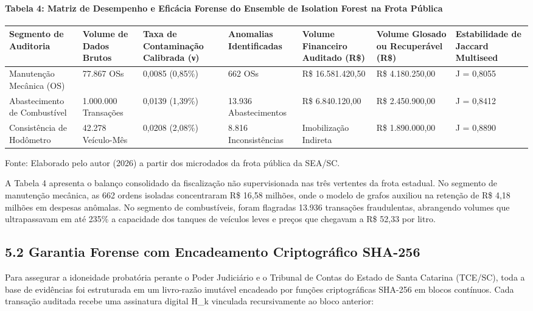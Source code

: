 \documentclass[10pt,a4paper,journal]{article}
\begin{document}
\paragraph{Tabela 4: Matriz de Desempenho e Eficácia Forense do Ensemble de Isolation Forest na Frota Pública}
\begin{table}[htbp]
\centering
\small
\begin{tabular}{lllllll}
\toprule
Segmento de Auditoria & Volume de Dados Brutos & Taxa de Contaminação Calibrada (ν) & Anomalias Identificadas & Volume Financeiro Auditado (R\$) & Volume Glosado ou Recuperável (R\$) & Estabilidade de Jaccard Multiseed \\
\midrule
Manutenção Mecânica (OS) & 77.867 OSs & 0,0085 (0,85\%) & 662 OSs & R\$ 16.581.420,50 & R\$ 4.180.250,00 & J = 0,8055 \\
Abastecimento de Combustível & 1.000.000 Transações & 0,0139 (1,39\%) & 13.936 Abastecimentos & R\$ 6.840.120,00 & R\$ 2.450.900,00 & J = 0,8412 \\
Consistência de Hodômetro & 42.278 Veículo-Mês & 0,0208 (2,08\%) & 8.816 Inconsistências & Imobilização Indireta & R\$ 1.890.000,00 & J = 0,8890 \\
\bottomrule
\end{tabular}
\end{table}
Fonte: Elaborado pelo autor (2026) a partir dos microdados da frota pública da SEA/SC.

A Tabela 4 apresenta o balanço consolidado da fiscalização não supervisionada nas três vertentes da frota estadual. No segmento de manutenção mecânica, as 662 ordens isoladas concentraram R\$ 16,58 milhões, onde o modelo de grafos auxiliou na retenção de R\$ 4,18 milhões em despesas anômalas. No segmento de combustíveis, foram flagradas 13.936 transações fraudulentas, abrangendo volumes que ultrapassavam em até 235\% a capacidade dos tanques de veículos leves e preços que chegavam a R\$ 52,33 por litro.

\subsection{5.2 Garantia Forense com Encadeamento Criptográfico SHA-256}
Para assegurar a idoneidade probatória perante o Poder Judiciário e o Tribunal de Contas do Estado de Santa Catarina (TCE/SC), toda a base de evidências foi estruturada em um livro-razão imutável encadeado por funções criptográficas SHA-256 em blocos contínuos. Cada transação auditada recebe uma assinatura digital H\_k vinculada recursivamente ao bloco anterior:
\end{document}
